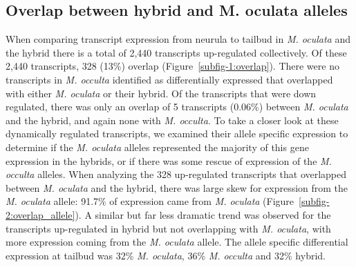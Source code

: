 \subsection{Overlap between hybrid and M. oculata alleles}
When comparing transcript expression from neurula to tailbud in \textit{M. oculata} and the hybrid there is a total of 2,440 transcripts up-regulated collectively. Of these 2,440 transcripts, 328 (13\%) overlap (Figure~\ref{subfig-1:overlap}). There were no transcripts in \textit{M. occulta} identified as differentially expressed that overlapped with either \textit{M. oculata} or their hybrid. Of the transcripts that were down regulated, there was only an overlap of 5 transcripts (0.06\%) between \textit{M. oculata} and the hybrid, and again none with \textit{M. occulta}. To take a closer look at these dynamically regulated transcripts, we examined their allele specific expression to determine if the \textit{M. oculata} alleles represented the majority of this gene expression in the hybrids, or if there was some rescue of expression of the \textit{M. occulta} alleles. When analyzing the 328 up-regulated transcripts that overlapped between \textit{M. oculata} and the hybrid, there was large skew for expression from the \textit{M. oculata} allele: 91.7\% of expression came from \textit{M. oculata} (Figure~\ref{subfig-2:overlap_allele}). A similar but far less dramatic trend was observed for the transcripts up-regulated in hybrid but not overlapping with \textit{M. oculata}, with more expression coming from the \textit{M. oculata} allele. The allele specific differential expression at tailbud was 32\% \textit{M. oculata}, 36\% \textit{M. occulta} and 32\% hybrid.

